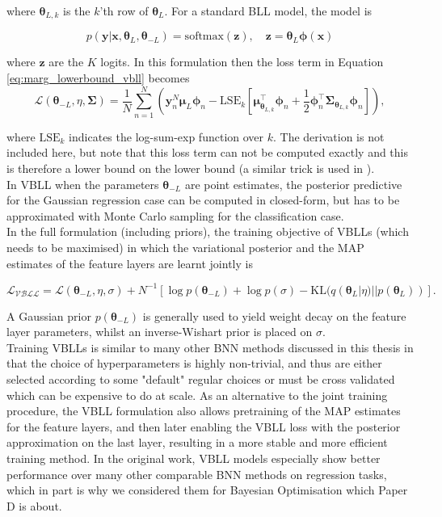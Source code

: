 \noindent where $\bm{\theta}_{L, k}$ is the $k$'th row of $\bm{\theta}_L$. For a standard BLL model, the model is

\begin{equation}
    p(\mathbf{y}|\mathbf{x}, \bm{\theta}_L, \bm{\theta}_{-L}) = \text{softmax}(\mathbf{z}), \quad \mathbf{z}=\bm{\theta}_L\bm\phi(\mathbf{x})
\end{equation}

\noindent where $\mathbf{z}$ are the $K$ logits. In this formulation then the loss term in Equation \ref{eq:marg_lowerbound_vbll} becomes
\begin{equation}
    \mathcal{L}(\bm{\theta}_{-L}, \eta, \bm\Sigma) = \frac{1}{N}\sum^N_{n=1}\left(\mathbf{y}_n^N \bm\mu_L\bm\phi_n - \text{LSE}_k\left[\bm\mu_{\bm{\theta}_{L, k}}^\top\bm\phi_n+\frac{1}{2}\bm\phi_n^\top\bm\Sigma_{\bm{\theta}_{L, k}}\bm\phi_n\right]\right),
\end{equation}

\noindent where $\text{LSE}_k$ indicates the log-sum-exp function over $k$. The derivation is not included here, but note that this loss term can not be computed exactly and this is therefore a lower bound on the lower bound (a similar trick is used in \cite{BLEI_classification}). \\

\noindent In VBLL when the parameters $\bm{\theta}_{-L}$ are point estimates, the posterior predictive for the Gaussian regression case can be computed in closed-form, but has to be approximated with Monte Carlo sampling for the classification case. \\

\noindent In the full formulation (including priors), the training objective of VBLLs (which needs to be maximised) in which the variational posterior and the MAP estimates of the feature layers are learnt jointly is

\begin{equation}
    \mathcal{L_{\text{VBLL}}}=\mathcal{L}(\bm{\theta}_{-L}, \eta, \sigma) + N^{-1}\left[\log p(\bm{\theta}_{-L})+ \log p(\sigma )-\text{KL}(q(\bm{\theta}_L|\eta)||p(\bm{\theta}_L))\right].
\end{equation}

\noindent A Gaussian prior $p(\bm{\theta}_{-L})$ is generally used to yield weight decay on the feature layer parameters, whilst an inverse-Wishart prior is placed on $\sigma$. \\

\noindent Training VBLLs is similar to many other BNN methods discussed in this thesis in that the choice of hyperparameters is highly non-trivial, and thus are either selected according to some "default" regular choices or must be cross validated which can be expensive to do at scale. As an alternative to the joint training procedure, the VBLL formulation also allows pretraining of the MAP estimates for the feature layers, and then later enabling the VBLL loss with the posterior approximation on the last layer, resulting in a more stable and more efficient training method. In the original work, VBLL models especially show better performance over many other comparable BNN methods on regression tasks, which in part is why we considered them for Bayesian Optimisation which Paper D is about.

